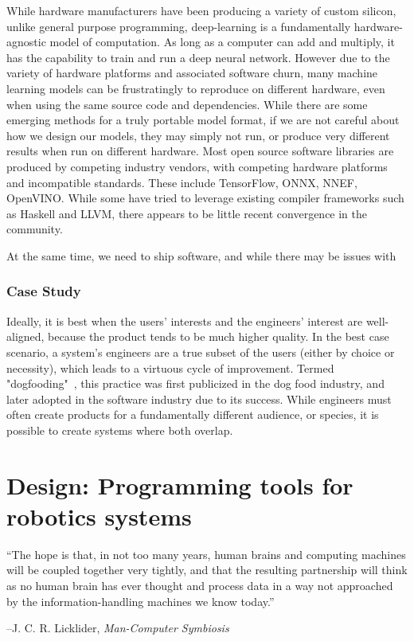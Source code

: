 \documentclass[12pt,initial,twoside,maitrise]{dms}
\numberwithin{equation}{section}
\numberwithin{table}{chapter}
\numberwithin{figure}{chapter}
\begin{document}
While hardware manufacturers have been producing a variety of custom silicon, unlike general purpose programming, deep-learning is a fundamentally hardware-agnostic model of computation. As long as a computer can add and multiply, it has the capability to train and run a deep neural network. However due to the variety of hardware platforms and associated software churn, many machine learning models can be frustratingly to reproduce on different hardware, even when using the same source code and dependencies. While there are some emerging methods for a truly portable model format, if we are not careful about how we design our models, they may simply not run, or produce very different results when run on different hardware. Most open source software libraries are produced by competing industry vendors, with competing hardware platforms and incompatible standards. These include TensorFlow, ONNX, NNEF, OpenVINO. While some have tried to leverage existing compiler frameworks such as Haskell and LLVM, there appears to be little recent convergence in the community.

At the same time, we need to ship software, and while there may be issues with

\subsection{Case Study}\label{subsec:case-study}

Ideally, it is best when the users' interests and the engineers' interest are well-aligned, because the product tends to be much higher quality. In the best case scenario, a system's engineers are a true subset of the users (either by choice or necessity), which leads to a virtuous cycle of improvement. Termed "dogfooding"~\cite{harrison2006eating}, this practice was first publicized in the dog food industry, and later adopted in the software industry due to its success. While engineers must often create products for a fundamentally different audience, or species, it is possible to create systems where both overlap.

\chapter{Design: Programming tools for robotics systems}\label{ch:hatchery}
\setlength{\epigraphwidth}{0.78\textwidth}
\epigraph{``The hope is that, in not too many years, human brains and computing machines will be coupled together very tightly, and that the resulting partnership will think as no human brain has ever thought and process data in a way not approached by the information-handling machines we know today.''}{\begin{flushright}--J. C. R. Licklider, \textit{Man-Computer Symbiosis}~\cite{licklider1960man}\end{flushright}}
\end{document}
